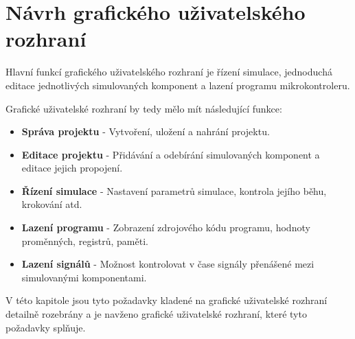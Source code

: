 \section{Návrh grafického uživatelského rozhraní}

Hlavní funkcí grafického uživatelského rozhraní je řízení simulace, jednoduchá editace jednotlivých simulovaných komponent a lazení programu mikrokontroleru.

Grafické uživatelské rozhraní by tedy mělo mít následující funkce:

\begin{itemize}
\item \textbf{Správa projektu} - Vytvoření, uložení a nahrání projektu.
\item \textbf{Editace projektu} - Přidávání a odebírání simulovaných komponent a editace jejich propojení.
\item \textbf{Řízení simulace} - Nastavení parametrů simulace, kontrola jejího běhu, krokování atd.
\item \textbf{Lazení programu} - Zobrazení zdrojového kódu programu, hodnoty proměnných, registrů, paměti.
\item \textbf{Lazení signálů} - Možnost kontrolovat v čase signály přenášené mezi simulovanými komponentami.
\end{itemize}

V této kapitole jsou tyto požadavky kladené na grafické uživatelské rozhraní detailně rozebrány a je navženo grafické uživatelské rozhraní, které tyto
požadavky splňuje.

